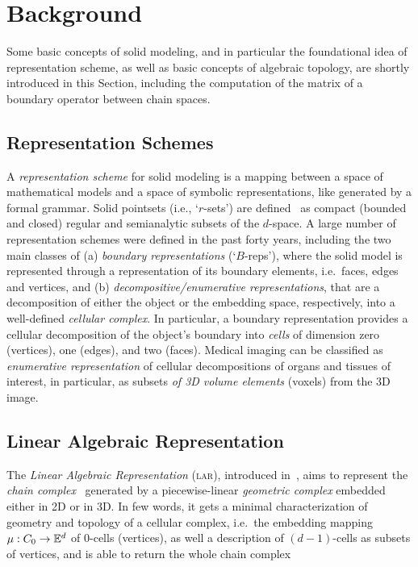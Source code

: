 \documentclass[11pt, oneside]{amsart}   	%
\begin{document}
%
\section{Background}\label{sec:background}

Some basic concepts of solid modeling, and in particular the foundational idea of representation scheme, as well as basic concepts of algebraic topology, are shortly introduced in this Section, including the computation of the matrix of a boundary operator between chain spaces.

\subsection{Representation Schemes}\label{sec:aaaa}

A \emph{representation scheme} for solid modeling is a mapping between a space of mathematical models and a space of symbolic representations, like generated by a formal grammar.
Solid pointsets (i.e., `$r$-sets') are defined~\cite{Requicha:1980:RRS:356827.356833} as compact (bounded and closed) regular and semianalytic subsets of the $d$-space. A large number of representation schemes were defined in the past forty years, including the two main classes of (a) \emph{boundary representations} (`$B$-reps'), where the solid model is represented through a representation of its boundary elements, i.e.~faces, edges and vertices, and (b) \emph{decompositive/enumerative representations}, that are a decomposition of either the object or the embedding space, respectively, into a well-defined \emph{cellular complex}. In particular, a boundary representation provides a cellular decomposition of the object's boundary into \emph{cells} of dimension zero (vertices), one (edges), and two (faces). Medical imaging can be classified as \emph{enumerative representation} of cellular decompositions of organs and tissues of interest, in particular, as subsets \emph{of 3D volume elements} (voxels) from the 3D image. 


\subsection{Linear Algebraic Representation}\label{sec:aaaa}

The \emph{Linear Algebraic Representation} (\textsc{lar}), introduced in~\cite{Dicarlo:2014:TNL:2543138.2543294}, aims to represent the \emph{chain complex}~\cite{TSAS} generated by a piecewise-linear \emph{geometric complex} embedded either in 2D or in 3D. In few words, it gets a minimal characterization of geometry and topology of a cellular complex, i.e.~the embedding mapping $\mu : C_0 \to \mathbb{E}^d$ of 0-cells (vertices), as well a description of $(d-1)$-cells as subsets of vertices, and is able to return the whole chain complex 
\end{document}
